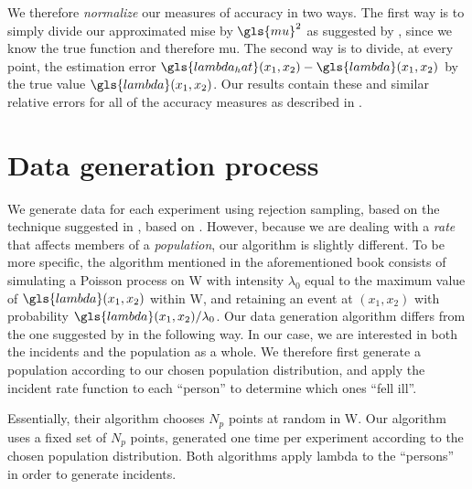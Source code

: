 We therefore \textit{normalize} our measures of accuracy in two ways.
The first way is to simply divide our approximated \gls{mise} by $\gls{mu}^2$
as suggested by \citet{diggle1988equivalence},
since we know the true function and therefore \gls{mu}.
The second way is to divide, at every point,
the estimation error $\gls{lambda_hat}\xvec - \gls{lambda}\xvec$ by the true value $\gls{lambda}\xvec$.
Our results contain these and similar relative errors for all of the accuracy measures
as described in .

\section{Data generation process}
\label{sec:theory:data}

We generate data for each experiment using rejection sampling,
based on the technique suggested in ,
based on \citet{lewis1979simulation}.
However,
because we are dealing with a \textit{rate} that affects members of a \textit{population},
our algorithm is slightly different.
To be more specific,
the algorithm mentioned in the aforementioned book consists of simulating a Poisson process on \gls{W}
with intensity $\lambda_0$ equal to the maximum value of $\gls{lambda}(x_1, x_2)$ within \gls{W},
and retaining an event at $(x_1, x_2)$ with
probability $\gls{lambda}(x_1, x_2)/\lambda_0$.
Our data generation algorithm differs from the one suggested by \citet{lewis1979simulation} in the following way.
In our case,
we are interested in both the \glspl{incident} and the population as a whole.
We therefore first generate a population according to our chosen population distribution,
and apply the \gls{incident} rate function to each ``person'' to determine which ones ``fell ill''.

Essentially, their algorithm chooses $N_p$ points at random in \gls{W}.
Our algorithm uses a fixed set of $N_p$ points, generated one time per experiment according to the chosen population distribution.
Both algorithms apply \gls{lambda} to the ``persons'' in order to generate incidents.

